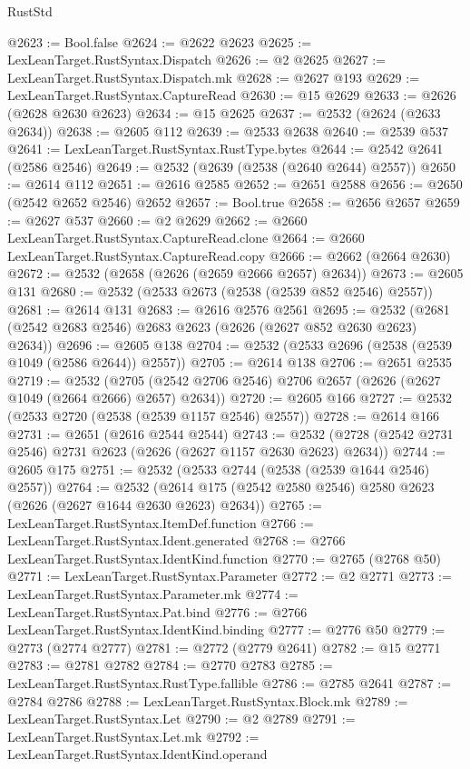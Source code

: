 \begin{lexlean}{RustStd}
\begin{coremodule}
@2623 := Bool.false
@2624 := @2622 @2623
@2625 := LexLeanTarget.RustSyntax.Dispatch
@2626 := @2 @2625
@2627 := LexLeanTarget.RustSyntax.Dispatch.mk
@2628 := @2627 @193
@2629 := LexLeanTarget.RustSyntax.CaptureRead
@2630 := @15 @2629
@2633 := @2626 (@2628 @2630 @2623)
@2634 := @15 @2625
@2637 := @2532 (@2624 (@2633 @2634))
@2638 := @2605 @112
@2639 := @2533 @2638
@2640 := @2539 @537
@2641 := LexLeanTarget.RustSyntax.RustType.bytes
@2644 := @2542 @2641 (@2586 @2546)
@2649 := @2532 (@2639 (@2538 (@2640 @2644) @2557))
@2650 := @2614 @112
@2651 := @2616 @2585
@2652 := @2651 @2588
@2656 := @2650 (@2542 @2652 @2546) @2652
@2657 := Bool.true
@2658 := @2656 @2657
@2659 := @2627 @537
@2660 := @2 @2629
@2662 := @2660 LexLeanTarget.RustSyntax.CaptureRead.clone
@2664 := @2660 LexLeanTarget.RustSyntax.CaptureRead.copy
@2666 := @2662 (@2664 @2630)
@2672 := @2532 (@2658 (@2626 (@2659 @2666 @2657) @2634))
@2673 := @2605 @131
@2680 := @2532 (@2533 @2673 (@2538 (@2539 @852 @2546) @2557))
@2681 := @2614 @131
@2683 := @2616 @2576 @2561
@2695 := @2532 (@2681 (@2542 @2683 @2546) @2683 @2623 (@2626 (@2627 @852 @2630 @2623) @2634))
@2696 := @2605 @138
@2704 := @2532 (@2533 @2696 (@2538 (@2539 @1049 (@2586 @2644)) @2557))
@2705 := @2614 @138
@2706 := @2651 @2535
@2719 := @2532
    (@2705 (@2542 @2706 @2546) @2706 @2657 (@2626 (@2627 @1049 (@2664 @2666) @2657) @2634))
@2720 := @2605 @166
@2727 := @2532 (@2533 @2720 (@2538 (@2539 @1157 @2546) @2557))
@2728 := @2614 @166
@2731 := @2651 (@2616 @2544 @2544)
@2743 := @2532 (@2728 (@2542 @2731 @2546) @2731 @2623 (@2626 (@2627 @1157 @2630 @2623) @2634))
@2744 := @2605 @175
@2751 := @2532 (@2533 @2744 (@2538 (@2539 @1644 @2546) @2557))
@2764 := @2532 (@2614 @175 (@2542 @2580 @2546) @2580 @2623 (@2626 (@2627 @1644 @2630 @2623) @2634))
@2765 := LexLeanTarget.RustSyntax.ItemDef.function
@2766 := LexLeanTarget.RustSyntax.Ident.generated
@2768 := @2766 LexLeanTarget.RustSyntax.IdentKind.function
@2770 := @2765 (@2768 @50)
@2771 := LexLeanTarget.RustSyntax.Parameter
@2772 := @2 @2771
@2773 := LexLeanTarget.RustSyntax.Parameter.mk
@2774 := LexLeanTarget.RustSyntax.Pat.bind
@2776 := @2766 LexLeanTarget.RustSyntax.IdentKind.binding
@2777 := @2776 @50
@2779 := @2773 (@2774 @2777)
@2781 := @2772 (@2779 @2641)
@2782 := @15 @2771
@2783 := @2781 @2782
@2784 := @2770 @2783
@2785 := LexLeanTarget.RustSyntax.RustType.fallible
@2786 := @2785 @2641
@2787 := @2784 @2786
@2788 := LexLeanTarget.RustSyntax.Block.mk
@2789 := LexLeanTarget.RustSyntax.Let
@2790 := @2 @2789
@2791 := LexLeanTarget.RustSyntax.Let.mk
@2792 := LexLeanTarget.RustSyntax.IdentKind.operand

\end{coremodule}
\end{lexlean}
